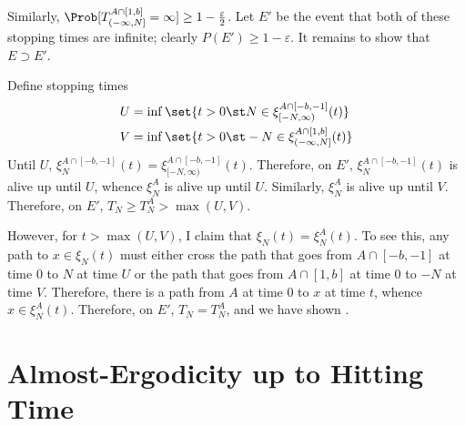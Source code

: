 \documentclass{scrartcl}
\newcommand{\ep}{\varepsilon}
\begin{document}
Similarly, $\Prob[T_{(-\infty,N]}^{A \cap [1,b]} = \infty] \geq 1 - \frac{\ep}{2}$. Let $E'$ be the event that both of these stopping times are infinite; clearly $P(E') \geq 1 - \ep$. It remains to show that $E \supset E'$.

Define stopping times
\begin{align*}
  U &= \inf\set{t > 0 \st N \in \xi_{[-N,\infty)}^{A \cap [-b,-1]}(t)} \\
  V &= \inf\set{t > 0 \st -N \in \xi_{(-\infty,N]}^{A \cap [1,b]}(t)}
\end{align*}
Until $U$, $\xi_{N}^{A \cap [-b,-1]}(t) = \xi_{[-N,\infty)}^{A \cap [-b,-1]}(t)$. Therefore, on $E'$, $\xi_{N}^{A \cap [-b,-1]}(t)$ is alive up until $U$, whence $\xi_{N}^{A}$ is alive up until $U$. Similarly, $\xi_{N}^{A}$ is alive up until $V$. Therefore, on $E'$, $T_{N} \geq T_{N}^{A} > \max(U,V)$.

However, for $t > \max(U,V)$, I claim that $\xi_{N}(t) = \xi_{N}^{A}(t)$. To see this, any path to $x \in \xi_{N}(t)$ must either cross the path that goes from $A \cap [-b,-1]$ at time $0$ to $N$ at time $U$ or the path that goes from $A \cap [1,b]$ at time $0$ to $-N$ at time $V$. Therefore, there is a path from $A$ at time $0$ to $x$ at time $t$, whence $x \in \xi_{N}^{A}(t)$. Therefore, on $E'$, $T_{N} = T_{N}^{A}$, and we have shown .




\section{Almost-Ergodicity up to Hitting Time}
\end{document}
